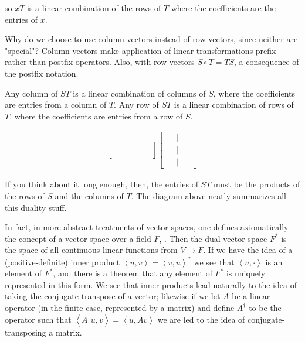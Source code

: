\documentclass{article}
\begin{document}
so $xT$ is a linear combination of the rows of $T$ where the coefficients are the entries of $x$. 

Why do we choose to use column vectors instead of row vectors, since neither are "special"? Column vectors make application of linear transformations prefix rather than postfix operators. Also, with row vectors $S \circ T = TS$, a consequence of the postfix notation.

Any column of $ST$ is a linear combination of columns of $S$, where the coefficients are entries from a column of $T$. Any row of $ST$ is a linear combination of rows of $T$, where the coefficients are entries from a row of $S$. 

\begin{align}
\begin{bmatrix}
\\
\mbox{------------}\\
\\
\end{bmatrix}
\begin{bmatrix}
\ \ & \big| &\ \ \\
\ \ & \big| &\ \ \\
\ \ & \big| &\ \ 
\end{bmatrix}
\end{align}

If you think about it long enough, then, the entries of $ST$ must be the products of the rows of $S$ and the columns of $T$. The diagram above neatly summarizes all this duality stuff.

In fact, in more abstract treatments of vector spaces, one defines axiomatically the concept of a vector space over a field $F$, . Then the dual vector space $F^*$ is the space of all continuous linear functions from $V \rightarrow F$. If we have the idea of a (positive-definite) inner product $\left<u,v\right> = \left<v,u\right>^*$ we see that $\left<u,\cdot\right>$ is an element of $F^*$, and there is a theorem that any element of $F^*$ is uniquely represented in this form. We see that inner products lead naturally to the idea of taking the conjugate transpose of a vector; likewise if we let $A$ be a linear operator (in the finite case, represented by a matrix) and define $A^\dagger$ to be the operator such that $\left<A^\dagger u, v\right>= \left<u, Av\right>$ we are led to the idea of conjugate-transposing a matrix.
\end{document}
